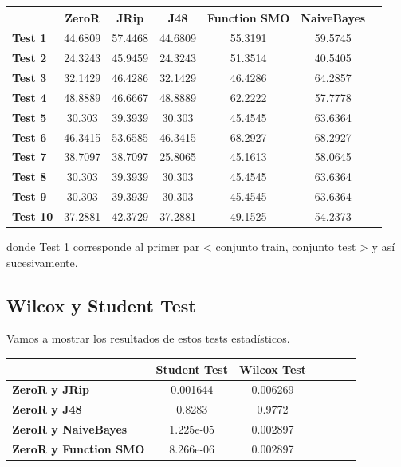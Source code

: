 \documentclass[11pt,a4paper,twoside]{tesis}
\begin{document}
\begin{table}[H]
\centering
\begin{tabular}{|l|c|c|c|c|c|c|}
\hline
\textbf{}  & \textbf{ZeroR} & \textbf{JRip} & \textbf{J48} & \textbf{Function SMO} & \textbf{NaiveBayes} \\ \hline
\textbf{Test 1}  & 44.6809 & 57.4468 & 44.6809 & 55.3191 & 59.5745\\ \hline
\textbf{Test 2}  & 24.3243 & 45.9459 & 24.3243 & 51.3514 & 40.5405\\ \hline
\textbf{Test 3}  & 32.1429 & 46.4286 & 32.1429 & 46.4286 & 64.2857\\ \hline
\textbf{Test 4}  & 48.8889 & 46.6667 & 48.8889 & 62.2222 & 57.7778\\ \hline
\textbf{Test 5}  & 30.303 & 39.3939 & 30.303 & 45.4545 & 63.6364\\ \hline
\textbf{Test 6}  & 46.3415 & 53.6585 & 46.3415 & 68.2927 & 68.2927\\ \hline
\textbf{Test 7}  & 38.7097 & 38.7097 & 25.8065 & 45.1613 & 58.0645\\ \hline
\textbf{Test 8}  & 30.303 & 39.3939 & 30.303 & 45.4545 & 63.6364\\ \hline
\textbf{Test 9}  & 30.303 & 39.3939 & 30.303 & 45.4545 & 63.6364\\ \hline
\textbf{Test 10} & 37.2881 & 42.3729 & 37.2881 & 49.1525 & 54.2373\\ \hline
\end{tabular}
\end{table}

donde Test 1 corresponde al primer par < conjunto train, conjunto test > y así sucesivamente.

\subsection{Wilcox y Student Test}

Vamos a mostrar los resultados de estos tests estadísticos.

\begin{table}[H]
\centering
\begin{tabular}{|l|c|c|c|c|c|c|}
\hline
\textbf{}  & \textbf{Student Test} & \textbf{Wilcox Test} \\ \hline
\textbf{ZeroR y JRip}  & 0.001644 & 0.006269 \\ \hline
\textbf{ZeroR y J48}  & 0.8283 & 0.9772 \\ \hline
\textbf{ZeroR y NaiveBayes}  & 1.225e-05 & 0.002897 \\ \hline
\textbf{ZeroR y Function SMO}  & 8.266e-06 & 0.002897 \\ \hline
\end{tabular}
\end{table}
\end{document}
